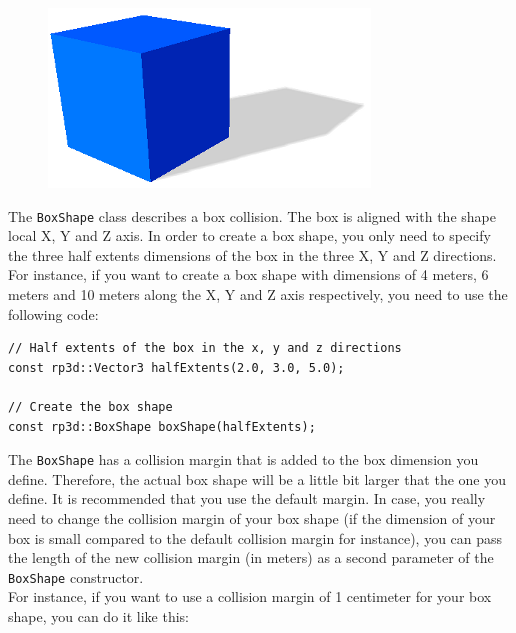 \documentclass[a4paper,12pt]{article}
\begin{document}
    \begin{figure}[h]
        \centering
        \includegraphics{boxshape.png}
        \label{fig:boxshape}
    \end{figure}

    The \texttt{BoxShape} class describes a box collision. The box is aligned with the shape local X, Y and Z axis.
    In order to create a box shape, you only need to specify the three half extents dimensions of the box in the three X, Y and Z directions. \\

    For instance, if you want to create a box shape with dimensions of 4 meters, 6 meters and 10 meters along the X, Y and Z axis respectively, you need to use the
    following code: \\

    \begin{lstlisting}
// Half extents of the box in the x, y and z directions
const rp3d::Vector3 halfExtents(2.0, 3.0, 5.0);

// Create the box shape
const rp3d::BoxShape boxShape(halfExtents);
  \end{lstlisting}

    \vspace{0.6cm}

    The \texttt{BoxShape} has a collision margin that is added to the box dimension you define. Therefore, the actual box shape will be a little bit larger that the one you define.
    It is recommended that you use the default margin. In case, you really need to change the collision margin of your box shape (if the dimension of your box is small compared
    to the default collision margin for instance), you can pass the length of the new collision margin (in meters) as a second parameter of the \texttt{BoxShape} constructor. \\

    For instance, if you want to use a collision margin of 1 centimeter for your box shape, you can do it like this: \\
\end{document}
